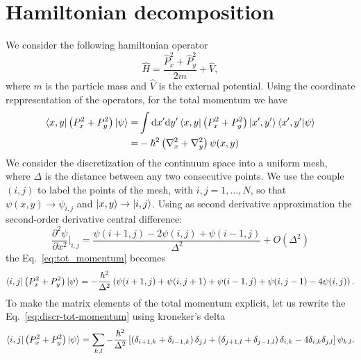 \section{Hamiltonian decomposition}
We consider the following hamiltonian operator
\begin{equation} \label{eq:hamiltonian-implementation}
\hat{H} = \frac{\hat{P}_x^2 + \hat{P}_y^2}{2m} + \hat{V},
\end{equation}
where $m$ is the particle mass and $\hat{V}$ is the external potential.
Using the coordinate reppresentation of the operators, for the total momentum we have
\begin{subequations}
\begin{align}
\bra{x,y} \left( P_x^2 + P_y^2 \right) \ket{\psi} = & \int \mathrm{d}x' \mathrm{d}y' \bra{x,y} \left( P_x^2 + P_y^2 \right) \ket{x',y'} \braket{x',y'|\psi} \label{eq:tot-momentum1} \\
= & -\hbar^2 \left( \nabla_x^2 + \nabla_y^2 \right) \psi(x,y) \label{eq:tot_momentum}
\end{align}
\end{subequations}
We consider the discretization of the continuum space into a uniform mesh, where $\Delta$ is the distance between any two consecutive points. We use the couple $(i,j)$ to label the points of the mesh, with $i,j = 1,\ldots , N$, so that $\psi(x,y) \rightarrow \psi_{i,j}$ and $\ket{x,y} \rightarrow \ket{i,j}$. Using as second derivative approximation the  second-order derivative central difference:
\begin{equation}
\frac{\partial^2 \psi}{\partial x^2} \bigg|_{i,j} = \frac{\psi(i+1,j) - 2 \psi(i,j) + \psi(i-1,j)}{\Delta^2} + O(\Delta^2)
\end{equation}
the Eq.~\eqref{eq:tot_momentum} becomes
\begin{equation} \label{eq:discr-tot-momentum}
\bra{i,j} \left( P_x^2 + P_y^2 \right) \ket{\psi} = -\frac{\hbar^2}{\Delta^2} \left( \psi(i+1,j) + \psi(i,j+1) + \psi(i-1,j) + \psi(i,j-1) - 4 \psi(i,j) \right).
\end{equation}
To make the matrix elements of the total momentum explicit, let us rewrite the Eq.~\eqref{eq:discr-tot-momentum} using kroneker's delta
\begin{equation} \label{eq:delta-k-momentum}
\bra{i,j} \left( P_x^2 + P_y^2 \right) \ket{\psi} = \sum_{k,l} -\frac{\hbar^2}{\Delta^2} \left[ \left( \delta_{i+1,k} + \delta_{i-1,k} \right) \delta_{j,l} + \left( \delta_{j+1,l} + \delta_{j-1,l} \right) \delta_{i,k} - 4 \delta_{i,k} \delta_{j,l} \right] \psi_{k,l}.
\end{equation}
